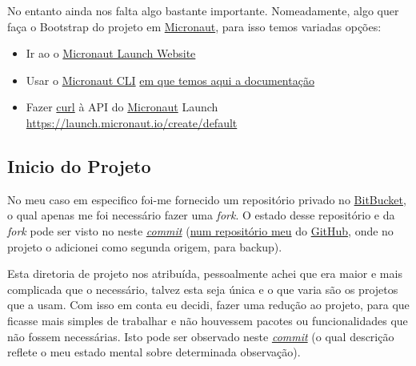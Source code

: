 No entanto ainda nos falta algo bastante importante. Nomeadamente, algo quer faça o Bootstrap do projeto em \href{https://micronaut.io/}{Micronaut}, para isso temos variadas opções:

\begin{itemize}
  \item Ir ao o \href{https://micronaut.io/launch}{Micronaut Launch Website}
  \item Usar o \href{https://micronaut.io/download/}{Micronaut CLI} \href{https://micronaut-projects.github.io/micronaut-starter/latest/guide/index.html}{em que temos aqui a documentação}
  \item Fazer \href{https://curl.se/}{curl} à API do \href{https://micronaut.io/}{Micronaut} Launch \href{https://launch.micronaut.io/create/default/com.optiply.project.webshop?lang=JAVA&build=GRADLE&test=JUNIT&javaVersion=JDK_17&features=jackson-databind&features=kubernetes-reactor-client&features=properties&features=flyway&features=jdbc-hikari&features=jooq&features=postgres&features=r2dbc&features=testcontainers&features=lombok&features=mockito&features=openrewrite&features=asciidoctor&features=logback&features=reactor&features=security-jwt&features=problem-json&features=jackson-xml}{https://launch.micronaut.io/create/default}
\end{itemize}

\subsection{Inicio do Projeto}

No meu caso em especifico foi-me fornecido um repositório privado no \href{https://bitbucket.org/}{BitBucket}, o qual apenas me foi necessário fazer uma \textit{fork}. O estado desse repositório e da \textit{fork} pode ser visto no neste \href{https://github.com/CatKinKitKat/MicronautJooqPostgresREST/tree/07d359ce933dde634f176dc95bf5ac1b3e4bc93d}{\textit{commit}} (\href{https://github.com/CatKinKitKat/MicronautJooqPostgresREST}{num repositório meu} do \href{https://github.com/}{GitHub}, onde no projeto o adicionei como segunda origem, para backup).

Esta diretoria de projeto nos atribuída, pessoalmente achei que era maior e mais complicada que o necessário, talvez esta seja única e o que varia são os projetos que a usam. Com isso em conta eu decidi, fazer uma redução ao projeto, para que ficasse mais simples de trabalhar e não houvessem pacotes ou funcionalidades que não fossem necessárias. Isto pode ser observado neste \href{https://github.com/CatKinKitKat/MicronautJooqPostgresREST/commit/3c71d709599662436ae13cf9dcf609a5ca5464e3}{\textit{commit}} (o qual descrição reflete o meu estado mental sobre determinada observação).

